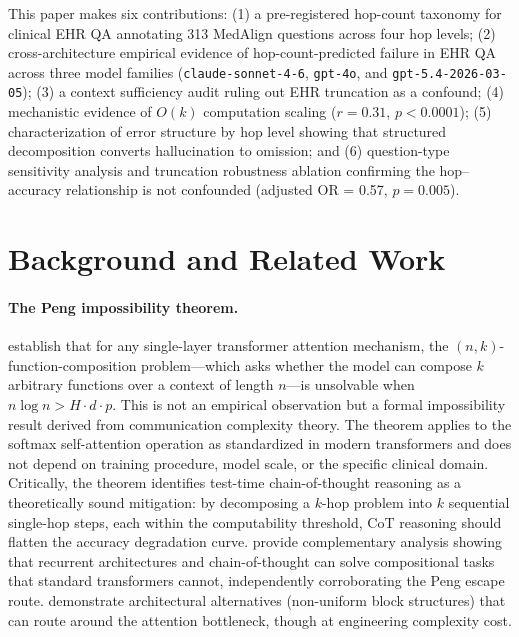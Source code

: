 \documentclass{article}
\begin{document}
This paper makes six contributions: (1) a pre-registered hop-count taxonomy for clinical EHR QA annotating 313 MedAlign questions across four hop levels; (2) cross-architecture empirical evidence of hop-count-predicted failure in EHR QA across three model families (\texttt{claude-sonnet-4-6}, \texttt{gpt-4o}, and \texttt{gpt-5.4-2026-03-05}); (3) a context sufficiency audit ruling out EHR truncation as a confound; (4) mechanistic evidence of $O(k)$ computation scaling ($r = 0.31$, $p < 0.0001$); (5) characterization of error structure by hop level showing that structured decomposition converts hallucination to omission; and (6) question-type sensitivity analysis and truncation robustness ablation confirming the hop--accuracy relationship is not confounded (adjusted OR = 0.57, $p = 0.005$).

\section{Background and Related Work}

\paragraph{The Peng impossibility theorem.}
\citet{peng2024limitations} establish that for any single-layer transformer
attention mechanism, the $(n, k)$-function-composition problem---which asks
whether the model can compose $k$ arbitrary functions over a context of length
$n$---is unsolvable when $n \log n > H \cdot d \cdot p$.
This is not an empirical observation but a formal impossibility result derived
from communication complexity theory. The theorem applies to the softmax
self-attention operation as standardized in modern transformers and does not
depend on training procedure, model scale, or the specific clinical domain.
Critically, the theorem identifies test-time chain-of-thought reasoning as a
theoretically sound mitigation: by decomposing a $k$-hop problem into $k$
sequential single-hop steps, each within the computability threshold,
CoT reasoning should flatten the accuracy degradation curve.
\citet{yehudai2025compositional} provide complementary analysis showing that
recurrent architectures and chain-of-thought can solve compositional tasks
that standard transformers cannot, independently corroborating the Peng
escape route. \citet{zhou2023brainformers} demonstrate architectural
alternatives (non-uniform block structures) that can route around the
attention bottleneck, though at engineering complexity cost.
\end{document}
